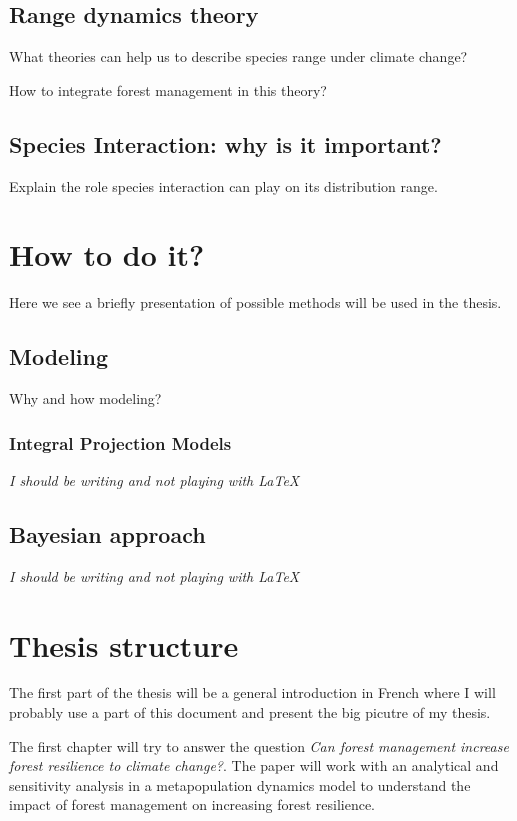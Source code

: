 \documentclass[a4paper,12pt,twoside]{article}
\begin{document}
\subsection*{Range dynamics theory}

What theories can help us to describe species range under climate change?

How to integrate forest management in this theory?

\subsection*{Species Interaction: why is it important?}

Explain the role species interaction can play on its distribution range.

\section{How to do it?}

Here we see a briefly presentation of possible methods will be used in the thesis.

\subsection*{Modeling}

Why and how modeling?

\subsubsection*{Integral Projection Models}

\textit{I should be writing and not playing with \LaTeX}

\subsection*{Bayesian approach}

\textit{I should be writing and not playing with \LaTeX}

\section*{Thesis structure}

The first part of the thesis will be a general introduction in French where  I will probably use a part of this document and present the big picutre of my thesis.

The first chapter will try to answer the question \textit{Can forest management increase forest resilience to climate change?}. The paper will work with an analytical and sensitivity analysis in a metapopulation dynamics model to understand the impact of forest management on increasing forest resilience.
\end{document}
